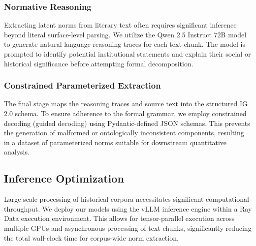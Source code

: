 \subsubsection{Normative Reasoning}
Extracting latent norms from literary text often requires significant inference beyond literal surface-level parsing. We utilize the Qwen 2.5 Instruct 72B model \cite{qwen25} to generate natural language reasoning traces for each text chunk. The model is prompted to identify potential institutional statements and explain their social or historical significance before attempting formal decomposition.

\subsubsection{Constrained Parameterized Extraction}
The final stage maps the reasoning traces and source text into the structured IG 2.0 schema. To ensure adherence to the formal grammar, we employ constrained decoding (guided decoding) using Pydantic-defined JSON schemas. This prevents the generation of malformed or ontologically inconsistent components, resulting in a dataset of parameterized norms suitable for downstream quantitative analysis.

\subsection{Inference Optimization}
Large-scale processing of historical corpora necessitates significant computational throughput. We deploy our models using the vLLM inference engine \cite{vllm} within a Ray Data execution environment. This allows for tensor-parallel execution across multiple GPUs and asynchronous processing of text chunks, significantly reducing the total wall-clock time for corpus-wide norm extraction.



